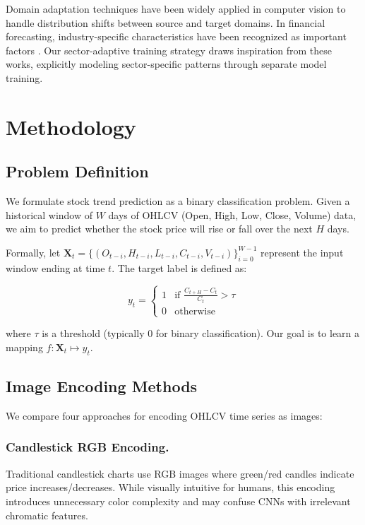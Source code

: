 \documentclass[runningheads]{llncs}
\begin{document}
Domain adaptation techniques have been widely applied in computer vision \cite{Ganin16,Long15} to handle distribution shifts between source and target domains. In financial forecasting, industry-specific characteristics have been recognized as important factors \cite{Moskowitz99}. Our sector-adaptive training strategy draws inspiration from these works, explicitly modeling sector-specific patterns through separate model training.


\section{Methodology}
\label{sec:method}

\subsection{Problem Definition}
\label{sec:problem}

We formulate stock trend prediction as a binary classification problem. Given a historical window of $W$ days of OHLCV (Open, High, Low, Close, Volume) data, we aim to predict whether the stock price will rise or fall over the next $H$ days.

Formally, let $\mathbf{X}_t = \{(O_{t-i}, H_{t-i}, L_{t-i}, C_{t-i}, V_{t-i})\}_{i=0}^{W-1}$ represent the input window ending at time $t$. The target label is defined as:

\begin{equation}
y_t = \begin{cases} 
1 & \text{if } \frac{C_{t+H} - C_t}{C_t} > \tau \\
0 & \text{otherwise}
\end{cases}
\label{eq:target}
\end{equation}

where $\tau$ is a threshold (typically 0 for binary classification). Our goal is to learn a mapping $f: \mathbf{X}_t \mapsto y_t$.

\subsection{Image Encoding Methods}
\label{sec:encoding_methods}

We compare four approaches for encoding OHLCV time series as images:

\subsubsection{Candlestick RGB Encoding.}
Traditional candlestick charts use RGB images where green/red candles indicate price increases/decreases. While visually intuitive for humans, this encoding introduces unnecessary color complexity and may confuse CNNs with irrelevant chromatic features.
\end{document}
